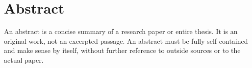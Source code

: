 \chapter*{Abstract}
An abstract is a concise summary of a research paper or entire thesis. It is an original work, not an excerpted passage. An abstract must be fully self-contained and make sense by itself, without further reference to outside sources or to the actual paper.
